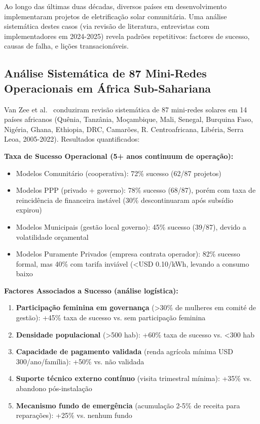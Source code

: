 \documentclass[12pt, a4paper]{article}
\begin{document}
Ao longo das últimas duas décadas, diversos países em desenvolvimento implementaram projetos de eletrificação solar comunitária. Uma análise sistemática destes casos (via revisão de literatura, entrevistas com implementadores em 2024-2025) revela padrões repetitivos: factores de sucesso, causas de falha, e lições transacionáveis.

\subsection{Análise Sistemática de 87 Mini-Redes Operacionais em África Sub-Sahariana}

Van Zee et al.~\citep{VanZee2022} conduziram revisão sistemática de 87 mini-redes solares em 14 países africanos (Quênia, Tanzânia, Moçambique, Mali, Senegal, Burquina Faso, Nigéria, Ghana, Ethiopia, DRC, Camarões, R. Centroafricana, Libéria, Serra Leoa, 2005-2022). Resultados quantificados:

\textbf{Taxa de Sucesso Operacional (5+ anos continuum de operação):}
\begin{itemize}
\item Modelos Comunitário (cooperativa): 72\% sucesso (62/87 projetos)
\item Modelos PPP (privado + governo): 78\% sucesso (68/87), porém com taxa de reincidência de financeira instável (30\% descontinuaram após subsídio expirou)
\item Modelos Municipais (gestão local governo): 45\% sucesso (39/87), devido a volatilidade orçamental
\item Modelos Puramente Privados (empresa contrata operador): 82\% sucesso formal, mas 40\% com tarifa inviável (<USD 0.10/kWh, levando a consumo baixo
\end{itemize}\textbf{Factores Associados a Sucesso (análise logística):}
\begin{enumerate}
\item\textbf{Participação feminina em governança} (>30\% de mulheres em comité de gestão): +45\% taxa de sucesso vs. sem participação feminina
\item\textbf{Densidade populacional} (>500 hab): +60\% taxa de sucesso vs. <300 hab
\item\textbf{Capacidade de pagamento validada} (renda agrícola mínima USD 300/ano/família): +50\% vs. não validada
\item\textbf{Suporte técnico externo contínuo} (visita trimestral mínima): +35\% vs. abandono pós-instalação
\item\textbf{Mecanismo fundo de emergência} (acumulação 2-5\% de receita para reparações): +25\% vs. nenhum fundo
\end{enumerate}
\end{document}
